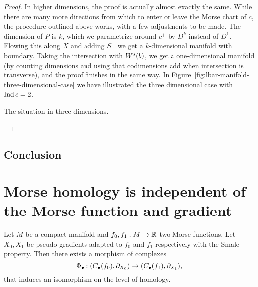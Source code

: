 \begin{proof}
    In higher dimensions, the proof is actually almost exactly the same.
    While there are many more directions from which to enter or leave the Morse chart of $c$, the procedure outlined above works, with a few adjustments to be made.
    The dimension of $P$ is $k$, which we parametrize around $c^{+}$ by $D^{k}$ instead of $D^{1}$. Flowing this along $X$ and adding $S^{+}$ we get a $k$-dimensional manifold with boundary. Taking the intersection with  $W^s(b)$, we get a one-dimensional manifold (by counting dimensions and using that codimensions add when intersection is transverse), and the proof finishes in the same way.
    In Figure~\ref{fig:lbar-manifold-three-dimensional-case} we have illustrated the three dimensional case with $\operatorname{Ind} c=2$.

\begin{marginfigure}
    \centering
    \caption{The situation in three dimensions.}
    \label{fig:lbar-manifold-three-dimensional-case}
\end{marginfigure}
\end{proof}

\subsection{Conclusion}



\section{Morse homology is independent of the Morse function and gradient}
\begin{theorem}
    Let $M$ be a compact manifold and $ f_0, f_1: M \to  \mathbb{R}$ two Morse functions.
    Let $X_0, X_1$ be pseudo-gradients adapted to $f_0$ and $ f_1$ respectively with the Smale property.
    Then there exists a morphism of complexes
    \[
        \Phi_{\bullet}:
        (C_\bullet(f_0), \partial_{X_0}) \to  
        (C_\bullet(f_1), \partial_{X_1})
    ,\] 
    that induces an isomorphism on the level of homology.
\end{theorem}
    
